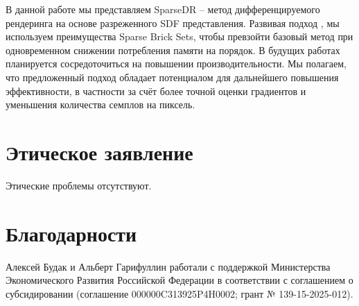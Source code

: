 \documentclass{article}
\begin{document}
В данной работе мы представляем SparseDR -- метод дифференцируемого рендеринга на основе разреженного SDF представления. Развивая подход \cite{DRSDF24}, мы используем преимущества Sparse Brick Sets, чтобы превзойти базовый метод при одновременном снижении потребления памяти на порядок. В будущих работах планируется сосредоточиться на повышении производительности. Мы полагаем, что предложенный подход обладает потенциалом для дальнейшего повышения эффективности, в частности за счёт более точной оценки градиентов и уменьшения количества семплов на пиксель.


\section*{Этическое заявление}

Этические проблемы отсутствуют.

\section*{Благодарности}

Алексей Будак и Альберт Гарифуллин работали с поддержкой Министерства Экономического Развития Российской Федерации в соответствии с соглашением о субсидировании (соглашение 000000C313925P4H0002; грант № 139-15-2025-012).



\end{document}
